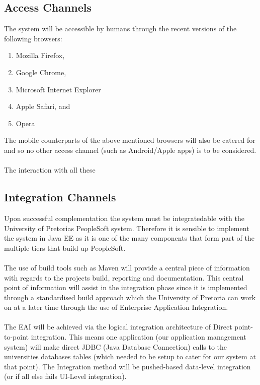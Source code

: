 \documentclass[12pt]{article}
\begin{document}
\subsection{Access Channels}
The system will be accessible by humans through the recent versions of the following browsers:
\begin{enumerate}
\item Mozilla Firefox,
\item Google Chrome,
\item Microsoft Internet Explorer
\item Apple Safari, and
\item Opera
\end{enumerate}
The mobile counterparts of the above mentioned browsers will also be catered for and so no other access channel (such as Android/Apple apps) is to be considered.\\
\\
The interaction with all these 
\subsection{Integration Channels}
Upon successful complementation the system must be integratedable with the University of Pretorias PeopleSoft system. Therefore it is sensible to implement the system in Java EE as it is one of the many components that form part of the multiple tiers that build up  PeopleSoft. \\
\\
The use of build tools such as Maven will provide a central piece of information with regards to the projects build, reporting and documentation. This central point of information will assist in the integration phase since it is implemented through a standardised build approach which the University of Pretoria can work on at a later time through the use of Enterprise Application Integration.\\
\\
The EAI will be achieved via  the logical integration architecture of Direct point-to-point integration. This means one application (our application management system) will make direct JDBC (Java Database Connection) calls to the universities databases tables (which needed to be setup to cater for our system at that point). The Integration method will be pushed-based data-level integration (or if all else fails UI-Level integration).
\end{document}
